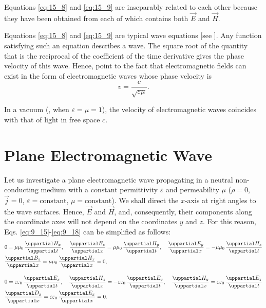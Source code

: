 \noindent
Equations \eqref{eq:15_8} and \eqref{eq:15_9} are inseparably related to each other because they have been obtained from  each
of which contains both $\vec{E}$ and $\vec{H}$.

Equations \eqref{eq:15_8} and \eqref{eq:15_9} are typical wave equations [see ].
Any function satisfying such an equation describes a wave.
The square root of the quantity that is the reciprocal of the coefficient of the time derivative gives the phase velocity of this wave.
Hence,  point to the fact that electromagnetic fields can exist in the form of electromagnetic waves whose phase velocity is
\begin{equation}\label{eq:15_10}
    v = \frac{c}{\sqrt{\varepsilon\mu}}.
\end{equation}

\noindent
In a vacuum (\ie, when $\varepsilon=\mu=1$), the velocity of electromagnetic waves coincides with that of light in free space $c$.

\section{Plane Electromagnetic Wave}\label{sec:15_2}

Let us investigate a plane electromagnetic wave propagating in a neutral non-conducting medium with a constant permittivity $\varepsilon$ and
permeability $\mu$ ($\rho=0$, $\vec{j}=0$, $\varepsilon=\text{constant}$, $\mu=\text{constant}$).
We shall direct the $x$-axis at right angles to the wave surfaces.
Hence, $\vec{E}$ and $\vec{H}$, and, consequently, their components along the coordinate axes will not depend on the coordinates $y$ and $z$.
For this reason, Eqs. \eqref{eq:9_15}-\eqref{eq:9_18} can be simplified as follows:
\begin{align}
    & 0 = \mu\mu_0\, \diffpartial{H_x}{t},\quad  \diffpartial{E_z}{x} = \mu\mu_0\, \diffpartial{H_y}{t}, \quad \diffpartial{E_y}{x} = -\mu\mu_0\, \diffpartial{H_z}{t} \label{eq:15_11} \\
    & \diffpartial{B_x}{x} = \mu\mu_0\, \diffpartial{H_x}{x} = 0,\label{eq:15_12}
\end{align}

\begin{align}
    & 0 = \varepsilon\varepsilon_0\, \diffpartial{E_x}{t}, \quad  \diffpartial{H_z}{x} = -\varepsilon \varepsilon_0\, \diffpartial{E_y}{t}, \quad \diffpartial{H_y}{x} = \varepsilon\varepsilon_0\, \diffpartial{E_z}{t} \label{eq:15_13}\\
    & \diffpartial{D_x}{x} = \varepsilon \varepsilon_0\, \diffpartial{E_x}{x} = 0.\label{eq:15_14}
\end{align}

